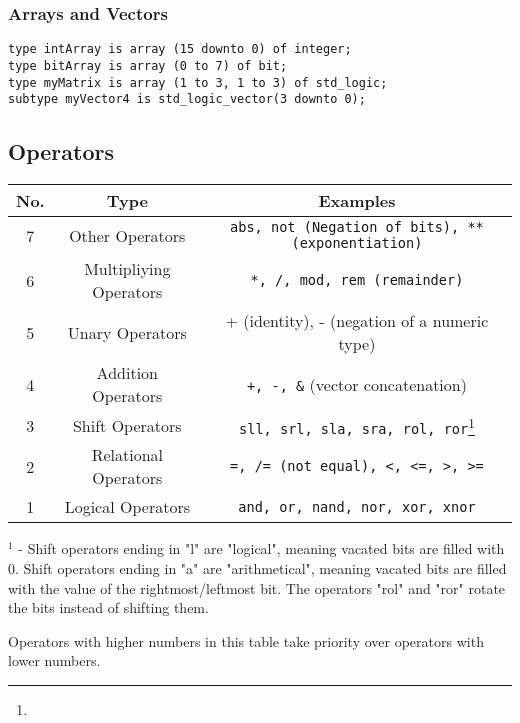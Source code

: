 \documentclass{report}
\newcommand*{\newpar}{\par\vspace{\baselineskip}\noindent} %
\begin{document}
\subsubsection{Arrays and Vectors}
\begin{verbatim}
type intArray is array (15 downto 0) of integer;
type bitArray is array (0 to 7) of bit;
type myMatrix is array (1 to 3, 1 to 3) of std_logic;
subtype myVector4 is std_logic_vector(3 downto 0);
\end{verbatim}
\subsection{Operators}
\newpar
\begin{tabular}{|c|c|c|}
\hline
    No. & Type & Examples\\\hline
    7 & Other Operators & \texttt{abs, not \textrm{(Negation of bits)}, ** \textrm{(exponentiation)}}\\\hline
    6 & Multipliying Operators & \texttt{*, /, mod, rem  \textrm{(remainder)}}\\\hline
    5 & Unary Operators & + (identity), - (negation of a numeric type)\\\hline
    4 & Addition Operators & \texttt{+, -, \&} (vector concatenation)\\\hline
    3 & Shift Operators &\texttt{sll, srl, sla, sra, rol, ror}\footnote[1]{}\\\hline
    2 & Relational Operators & \texttt{=, /= \textrm{(not equal)}, <, <=, >, >=}\\\hline
    1 & Logical Operators &\texttt{and, or, nand, nor, xor, xnor}\\\hline
\end{tabular}
\newpar
$^1$ - Shift operators ending in "l" are "logical", meaning vacated bits are filled with 0. Shift operators ending in "a" are "arithmetical", meaning vacated bits are filled with the value of the rightmost/leftmost bit. The operators "rol" and "ror" rotate the bits instead of shifting them.
\newpar
Operators with higher numbers in this table take priority over operators with lower numbers.
\end{document}
